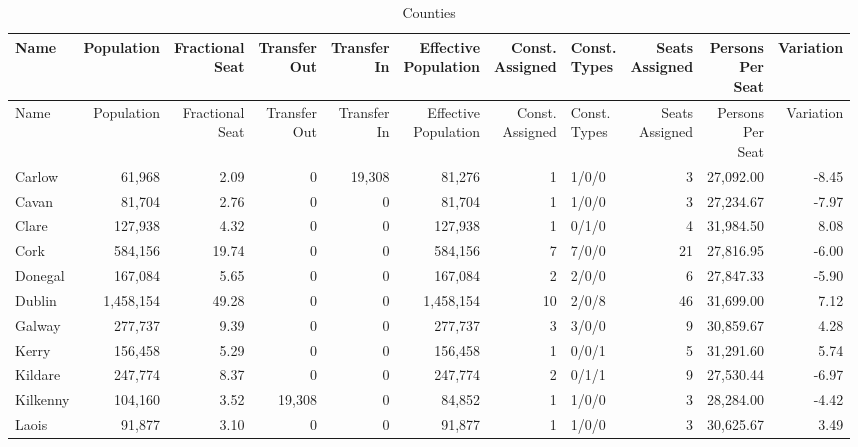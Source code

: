 \documentclass[a4paper]{article}
\begin{document}
\begin{longtable}{lrrrrrrlrrr}
\caption{Counties}
\\ \toprule
Name &Population &\shortstack{Fractional\\Seat} &\shortstack{Transfer\\Out} &\shortstack{Transfer\\In} &\shortstack{Effective\\Population} &\shortstack{Const.\\Assigned} &\shortstack{Const.\\Types} &\shortstack{Seats\\Assigned} &\shortstack{Persons\\Per\\Seat} &Variation \\ \midrule
\endfirsthead
\toprule
Name &Population &\shortstack{Fractional\\Seat} &\shortstack{Transfer\\Out} &\shortstack{Transfer\\In} &\shortstack{Effective\\Population} &\shortstack{Const.\\Assigned} &\shortstack{Const.\\Types} &\shortstack{Seats\\Assigned} &\shortstack{Persons\\Per\\Seat} &Variation \\ \midrule
\endhead
\bottomrule
\endfoot
Carlow&61,968& 2.09&0&19,308&81,276&1&1/0/0&3&27,092.00&-8.45\\ 
Cavan&81,704& 2.76&0&0&81,704&1&1/0/0&3&27,234.67&-7.97\\ 
Clare&127,938& 4.32&0&0&127,938&1&0/1/0&4&31,984.50& 8.08\\ 
Cork&584,156&19.74&0&0&584,156&7&7/0/0&21&27,816.95&-6.00\\ 
Donegal&167,084& 5.65&0&0&167,084&2&2/0/0&6&27,847.33&-5.90\\ 
Dublin&1,458,154&49.28&0&0&1,458,154&10&2/0/8&46&31,699.00& 7.12\\ 
Galway&277,737& 9.39&0&0&277,737&3&3/0/0&9&30,859.67& 4.28\\ 
Kerry&156,458& 5.29&0&0&156,458&1&0/0/1&5&31,291.60& 5.74\\ 
Kildare&247,774& 8.37&0&0&247,774&2&0/1/1&9&27,530.44&-6.97\\ 
Kilkenny&104,160& 3.52&19,308&0&84,852&1&1/0/0&3&28,284.00&-4.42\\ 
Laois&91,877& 3.10&0&0&91,877&1&1/0/0&3&30,625.67& 3.49\\ 

\end{longtable}
\end{document}
